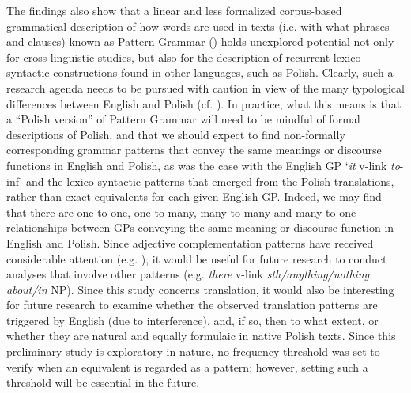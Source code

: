 \documentclass[output=paper]{langscibook}
\begin{document}
The findings also show that a linear and less formalized corpus-based grammatical description of how words are used in texts (i.e. with what phrases and clauses) known as Pattern Grammar  (\citealt{HunstonFrancis2000}) holds unexplored potential not only for cross-linguistic studies, but also for the description of recurrent lexico-syntactic constructions found in other languages, such as Polish. Clearly, such a research agenda needs to be pursued with caution in view of the many typological differences between English and Polish (cf. \citealt{FisiakEtAl1978, WillimMańczak-Wohlfeld1997}). In practice, what this means is that a “Polish version” of Pattern Grammar will need to be mindful of formal descriptions of Polish, and that we should expect to find non-formally corresponding grammar patterns that convey the same meanings or discourse functions in English and Polish, as was the case with the English GP ‘\textit{it} v-link {\ADJ} \textit{to}{}-inf’ and the lexico-syntactic patterns that emerged from the Polish translations, rather than exact equivalents for each given English GP. Indeed, we may find that there are one-to-one, one-to-many, many-to-many and many-to-one relationships between GPs conveying the same meaning or discourse function in English and Polish. Since adjective complementation patterns have received considerable attention (e.g. \citealt{SuHunston2019}), it would be useful for future research to conduct analyses that involve other patterns (e.g. \textit{there} v-link \textit{sth/anything/nothing} {\ADJ} \textit{about/in} NP). Since this study concerns translation, it would also be interesting for future research to examine whether the observed translation patterns are triggered by English (due to interference), and, if so, then to what extent, or whether they are natural and equally formulaic in native Polish texts. Since this preliminary study is exploratory in nature, no frequency threshold was set to verify when an equivalent is regarded as a pattern; however, setting such a threshold will be essential in the future. 
\end{document}
